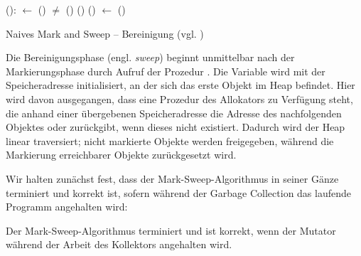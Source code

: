\begin{algorithm}
\begin{algorithmic}[1]
	\State {}():
	\State \quad {} $\gets$ ()
	\State \quad \WHILE {} $\neq$ \Null
	\State \quad \quad \IF {}()
	\State \quad \quad \quad {}()
	\State \quad \quad \ELSE {}()
	\State \quad \quad {} $\gets$ ()
\end{algorithmic}
\caption[Naives Mark and Sweep -- Bereinigung]{Naives Mark and Sweep -- Bereinigung (vgl. \cite[Kap. 2.2]{jones-lins})}
\label{algo:naive-sweep}
\end{algorithm}

Die Bereinigungsphase (engl. \textit{sweep}) beginnt unmittelbar nach der Markierungsphase durch Aufruf der Prozedur .
Die Variable  wird mit der Speicheradresse initialisiert, an der sich das erste Objekt im Heap befindet.
Hier wird davon ausgegangen, dass eine Prozedur  des Allokators zu Verfügung steht, die anhand einer übergebenen Speicheradresse die Adresse des nachfolgenden Objektes oder \Null zurückgibt, wenn dieses nicht existiert.
Dadurch wird der Heap linear traversiert; nicht markierte Objekte werden freigegeben, während die Markierung erreichbarer Objekte zurückgesetzt wird.

Wir halten zunächst fest, dass der Mark-Sweep-Algorithmus in seiner Gänze terminiert und korrekt ist, sofern während der Garbage Collection das laufende Programm angehalten wird:

\begin{mybox}
\begin{satz}
	\label{satz:mark-sweep-correctness}
	Der Mark-Sweep-Algorithmus terminiert und ist korrekt, wenn der Mutator während der Arbeit des Kollektors angehalten wird.
\end{satz}
\end{mybox}

